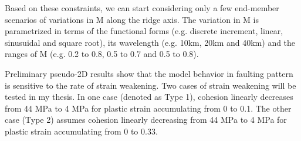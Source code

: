 Based on these constraints, we can start considering only a few end-member scenarios of variations in M along the ridge axis. The variation in M is parametrized in terms of the functional forms (e.g. discrete increment, linear, sinusuidal and square root), its wavelength (e.g. 10km, 20km and 40km) and the ranges of M (e.g. 0.2 to 0.8, 0.5 to 0.7 and 0.5 to 0.8). 

Preliminary pseudo-2D results show that the model behavior in faulting pattern is sensitive to the rate of strain weakening. Two cases of strain weakening will be tested in my thesis. In one case (denoted as Type 1), cohesion linearly decreases from 44 MPa to 4 MPa for plastic strain accumulating from 0 to 0.1. The other case (Type 2) assumes cohesion linearly decreasing from 44 MPa to 4 MPa for plastic strain accumulating from 0 to 0.33.
